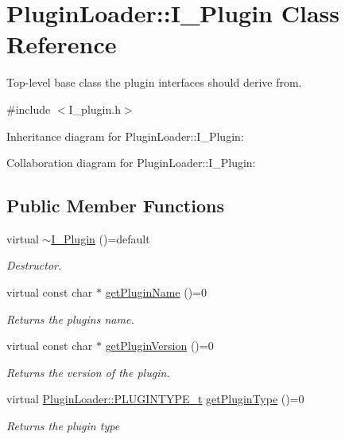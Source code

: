 \hypertarget{classPluginLoader_1_1I__Plugin}{}\section{Plugin\+Loader\+::I\+\_\+\+Plugin Class Reference}
\label{classPluginLoader_1_1I__Plugin}


Top-\/level base class the plugin interfaces should derive from.  




{\ttfamily \#include $<$I\+\_\+plugin.\+h$>$}



Inheritance diagram for Plugin\+Loader\+::I\+\_\+\+Plugin\+:


Collaboration diagram for Plugin\+Loader\+::I\+\_\+\+Plugin\+:
\subsection*{Public Member Functions}
\begin{DoxyCompactItemize}
\item 
\mbox{\label{classPluginLoader_1_1I__Plugin_abfda98d2687828daad7f0b5892fb7a86}} 
virtual \mbox{\hyperlink{classPluginLoader_1_1I__Plugin_abfda98d2687828daad7f0b5892fb7a86}{$\sim$\+I\+\_\+\+Plugin}} ()=default
\begin{DoxyCompactList}\small\item\em Destructor. \end{DoxyCompactList}\item 
virtual const char $\ast$ \mbox{\hyperlink{classPluginLoader_1_1I__Plugin_a4c45255b16398fff512940a5e5b8322a}{get\+Plugin\+Name}} ()=0
\begin{DoxyCompactList}\small\item\em Returns the plugins name. \end{DoxyCompactList}\item 
virtual const char $\ast$ \mbox{\hyperlink{classPluginLoader_1_1I__Plugin_a43fb739a14ea1cc5ca6a77896a5f7b8f}{get\+Plugin\+Version}} ()=0
\begin{DoxyCompactList}\small\item\em Returns the version of the plugin. \end{DoxyCompactList}\item 
virtual \mbox{\hyperlink{namespacePluginLoader_a7b1358e9577b47b5d4b16231a5a81699}{Plugin\+Loader\+::\+P\+L\+U\+G\+I\+N\+T\+Y\+P\+E\+\_\+t}} \mbox{\hyperlink{classPluginLoader_1_1I__Plugin_aa7d2ca3f7a8551c590a7cbda0f1648f5}{get\+Plugin\+Type}} ()=0
\begin{DoxyCompactList}\small\item\em Returns the plugin {\itshape type} \end{DoxyCompactList}\end{DoxyCompactItemize}


